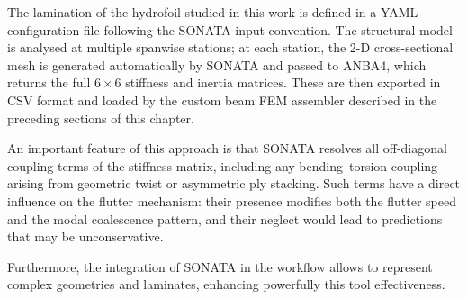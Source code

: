 The lamination of the hydrofoil studied in this work is defined in a YAML configuration
file following the SONATA input convention.
The structural model is analysed at multiple spanwise stations; at each station, the 2-D
cross-sectional mesh is generated automatically by SONATA and passed to ANBA4, which returns
the full $6\times6$ stiffness and inertia matrices.
These are then exported in CSV format and loaded by the custom beam FEM assembler described in
the preceding sections of this chapter.

An important feature of this approach is that SONATA resolves all off-diagonal coupling terms
of the stiffness matrix, including any bending--torsion coupling arising from geometric twist
or asymmetric ply stacking.
Such terms have a direct influence on the flutter mechanism: their presence modifies both the
flutter speed and the modal coalescence pattern, and their neglect would lead to predictions
that may be unconservative.

Furthermore, the integration of SONATA in the workflow allows to represent complex geometries and
laminates, enhancing powerfully this tool effectiveness.


